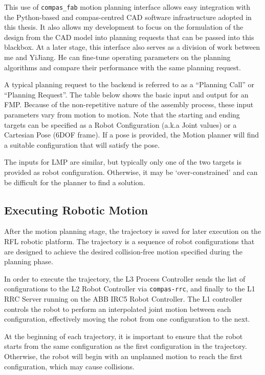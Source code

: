 This use of \verb|compas_fab| motion planning interface allows easy integration with the Python-based and compas-centred CAD software infrastructure adopted in this thesis. It also allows my development to focus on the formulation of the design from the CAD model into planning requests that can be passed into this blackbox. At a later stage, this interface also serves as a division of work between me and YiJiang. He can fine-tune operating parameters on the planning algorithms and compare their performance with the same planning request.

A typical planning request to the backend is referred to as a “Planning Call” or “Planning Request”. The table below shows the basic input and output for an FMP. Because of the non-repetitive nature of the assembly process, these input parameters vary from motion to motion. Note that the starting and ending targets can be specified as a Robot Configuration (a.k.a Joint values) or a Cartesian Pose (6DOF frame). If a pose is provided, the Motion planner will find a suitable configuration that will satisfy the pose.

The inputs for LMP are similar, but typically only one of the two targets is provided as robot configuration. Otherwise, it may be ‘over-constrained’ and can be difficult for the planner to find a solution.


\subsection{Executing Robotic Motion}
\label{subsection:exploration-2-executing-robotic-motion}

After the motion planning stage, the trajectory is saved for later execution on the RFL robotic platform. The trajectory is a sequence of robot configurations that are designed to achieve the desired collision-free motion specified during the planning phase.

In order to execute the trajectory, the L3 Process Controller  sends the list of configurations to the L2 Robot Controller via \verb|compas-rrc|, and finally to the L1 RRC Server running on the ABB IRC5 Robot Controller. The L1 controller controls the robot to perform an interpolated joint motion  between each configuration, effectively moving the robot from one configuration to the next.

At the beginning of each trajectory, it is important to ensure that the robot starts from the same configuration as the first configuration in the trajectory. Otherwise, the robot will begin with an unplanned motion to reach the first configuration, which may cause collisions.

